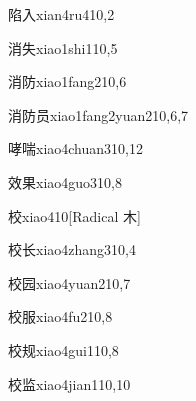 \begin{verbete}{陷入}{xian4ru4}{10,2}
\end{verbete}

\begin{verbete}{消失}{xiao1shi1}{10,5}
\end{verbete}

\begin{verbete}{消防}{xiao1fang2}{10,6}
\end{verbete}

\begin{verbete}{消防员}{xiao1fang2yuan2}{10,6,7}
\end{verbete}

\begin{verbete}{哮喘}{xiao4chuan3}{10,12}
\end{verbete}

\begin{verbete}{效果}{xiao4guo3}{10,8}
\end{verbete}

\begin{verbete}{校}{xiao4}{10}[Radical 木]
\end{verbete}

\begin{verbete}{校长}{xiao4zhang3}{10,4}
\end{verbete}

\begin{verbete}{校园}{xiao4yuan2}{10,7}
\end{verbete}

\begin{verbete}{校服}{xiao4fu2}{10,8}
\end{verbete}

\begin{verbete}{校规}{xiao4gui1}{10,8}
\end{verbete}

\begin{verbete}{校监}{xiao4jian1}{10,10}
\end{verbete}

